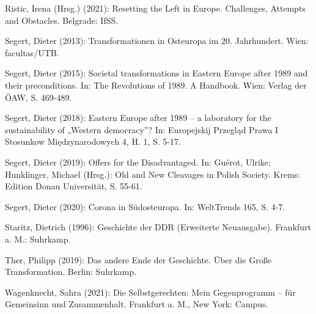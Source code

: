 \begin{multicols*}{2}
\begin{bibdescription}
        \item Ristic, Irena (Hrsg.) (2021): Resetting the Left in Europe. Challenges, Attempts and Obstacles. Belgrade: IfSS.
        \item Segert, Dieter (2013): Transformationen in Osteuropa im 20. Jahrhundert. Wien: facultas/UTB.
        \item Segert, Dieter (2015): Societal transformations in Eastern Europe after 1989 and their preconditions. In: The Revolutions of 1989. A Handbook. Wien: Verlag der ÖAW, S. 469-489.
        \item Segert, Dieter (2018): Eastern Europe after 1989 – a laboratory for the sustainability of „Western democracy”? In: Europejskij Przegląd Prawa I Stosunkow Międzynarodowych 4, H. 1, S. 5-17.
        \item Segert, Dieter (2019): Offers for the Disadvantaged. In: Guérot, Ulrike; Hunklinger, Michael (Hrsg.): Old and New Cleavages in Polish Society. Krems: Edition Donau Universität, S. 55-61.
        \item Segert, Dieter (2020): Corona in Südosteuropa. In: WeltTrends 165, S. 4-7.
        \item Staritz, Dietrich (1996): Geschichte der DDR (Erweiterte Neuausgabe). Frankfurt a. M.: Suhrkamp.
        \item Ther, Philipp (2019): Das andere Ende der Geschichte. Über die Große Transformation. Berlin: Suhrkamp.
        \item Wagenknecht, Sahra (2021): Die Selbstgerechten: Mein Gegenprogramm – für Gemeinsinn und Zusammenhalt. Frankfurt a. M., New York: Campus.
        
    \end{bibdescription}

\end{multicols*}